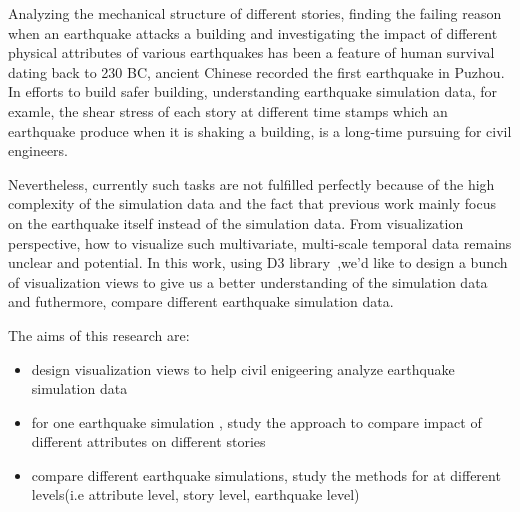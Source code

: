 Analyzing the mechanical structure of different stories, finding the failing reason when an earthquake attacks a building and investigating the impact of different physical attributes of various earthquakes has been a feature of human survival dating back to 230 BC, ancient Chinese recorded the first earthquake in Puzhou. In efforts to build safer building, understanding earthquake simulation data, for examle, the shear stress of each story at different time stamps which an earthquake produce when it is shaking a building, is a long-time pursuing for civil engineers. 

Nevertheless, currently such tasks are not fulfilled perfectly because of the high complexity of the simulation data and the fact that previous work mainly focus on the earthquake itself instead of the simulation data. From visualization perspective, how to visualize such multivariate, multi-scale temporal data remains unclear and potential. In this work, using D3 library~\cite{Bostock:2011:DDD:2068462.2068631},we'd like to design a bunch of visualization views to give us a better understanding of the simulation data and futhermore, compare different earthquake simulation data. 

The aims of this research are:
\begin{itemize}
  \item design visualization views to help civil enigeering analyze earthquake simulation data
  \item for one earthquake simulation , study the approach to compare impact of different attributes on different stories
  \item compare different earthquake simulations, study the methods for at different levels(i.e attribute level, story level, earthquake level)
\end{itemize}

